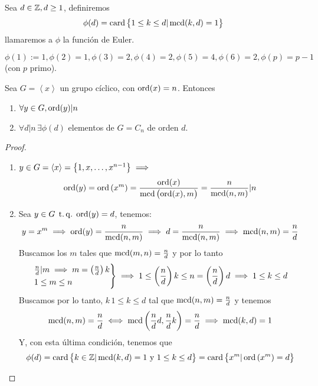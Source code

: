 \begin{defi}
    Sea $d \in \mathbb{Z}, d \geq 1$, definiremos
    \[
        \phi(d) = \operatorname{card} \left\{ 1 \leq k \leq d \vert \operatorname{mcd}(k, d) = 1\right\}
    \]
    llamaremos a $\phi$ la función de Euler.
\end{defi}

\begin{example}
    $\phi(1) := 1, \phi(2) = 1, \phi(3) = 2, \phi(4) = 2, \phi(5) = 4, \phi(6) = 2, \phi(p) = p-1$
    (con $p$ primo).
\end{example}

\begin{prop}
    Sea $G = \left< x \right>$ un grupo cíclico, con $\operatorname{ord}(x) = n$. Entonces
    \begin{enumerate}
        \item $\forall y \in G, \operatorname{ord}(y) \vert n$
        \item $\forall d \vert n \, \exists \phi(d)$ elementos de $G = C_n$ de orden $d$.
    \end{enumerate}
\end{prop}

\begin{proof}
    \begin{enumerate}
        \item $y \in G = \left< x \right> = \left\{1, x, \dots, x^{n-1}\right\} \implies$
                \[
                    \operatorname{ord}(y) = \operatorname{ord}\left( x^m \right) = \frac{\operatorname{ord}(x)}{\operatorname{mcd}\left(\operatorname{ord}(x), m \right)} =
                    \frac{n}{\operatorname{mcd}(n, m)} \vert n
                \]
        \item Sea $y \in G \operatorname{\;t.q.\;} \operatorname{ord}(y) = d$, tenemos:
                \[
                    y = x^m \implies \operatorname{ord}(y) = \frac{n}{\operatorname{mcd}(n, m)} \implies d = \frac{n}{\operatorname{mcd}(n, m)} 
                    \implies \operatorname{mcd}(n, m) = \frac{n}{d}
                \]
                Buscamos los $m$ tales que $\operatorname{mcd}(m, n) = \frac{n}{d}$ y por lo tanto
                \[
                    \begin{rcases}
                        \frac{n}{d} \vert m \implies m = \left( \frac{n}{d} \right)k \\
                        1 \leq m \leq n
                    \end{rcases}
                    \implies 1 \leq \left( \frac{n}{d} \right)k \leq n = \left( \frac{n}{d} \right)d
                    \implies 1 \leq k \leq d
                \]
                Buscamos por lo tanto, $k\, 1 \leq k \leq d$ tal que $\operatorname{mcd}(n, m) = \frac{n}{d}$ y tenemos
                \[
                    \operatorname{mcd}(n, m) = \frac{n}{d} \iff \operatorname{mcd}\left( \frac{n}{d}d, \frac{n}{d}k \right) = \frac{n}{d}
                    \implies \operatorname{mcd}(k, d) = 1
                \]
                Y, con esta última condición, tenemos que
                \[
                    \phi(d) = \operatorname{card} \left\{ k \in \mathbb{Z} \vert \operatorname{mcd}(k, d) = 1 \text{ y } 1 \leq k \leq d\right\}
                    = \operatorname{card} \left\{ x^m \vert \operatorname{ord}\left( x^m \right) = d\right\}
                \]
    \end{enumerate}
\end{proof}

